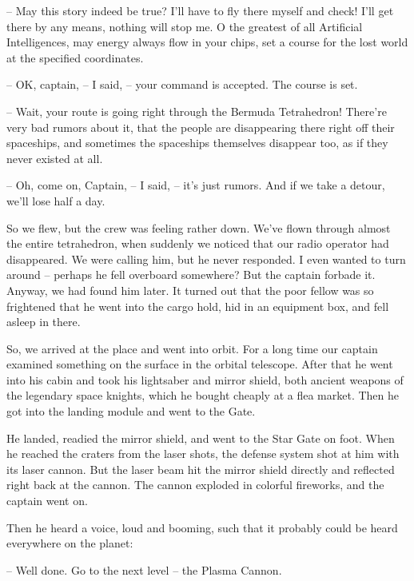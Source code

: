 \documentclass[ebook,oneside,final,openright]{memoir}
\begin{document}
– May this story indeed be true? I’ll have to fly there myself and check! I’ll get there by any means, nothing will stop me. O the greatest of all Artificial Intelligences, may energy always flow in your chips, set a course for the lost world at the specified coordinates.\par
– OK, captain, – I said, – your command is accepted. The course is set.\par
– Wait, your route is going right through the Bermuda Tetrahedron! There’re very bad rumors about it, that the people are disappearing there right off their spaceships, and sometimes the spaceships themselves disappear too, as if they never existed at all.\par
– Oh, come on, Captain, – I said, – it’s just rumors. And if we take a detour, we’ll lose half a day.\par
\par
So we flew, but the crew was feeling rather down. We’ve flown through almost the entire tetrahedron, when suddenly we noticed that our radio operator had disappeared. We were calling him, but he never responded. I even wanted to turn around – perhaps he fell overboard somewhere? But the captain forbade it. Anyway, we had found him later. It turned out that the poor fellow was so frightened that he went into the cargo hold, hid in an equipment box, and fell asleep in there.\par
\par
So, we arrived at the place and went into orbit. For a long time our captain examined something on the surface in the orbital telescope. After that he went into his cabin and took his lightsaber and mirror shield, both ancient weapons of the legendary space knights, which he bought cheaply at a flea market. Then he got into the landing module and went to the Gate.\par
\par
He landed, readied the mirror shield, and went to the Star Gate on foot. When he reached the craters from the laser shots, the defense system shot at him with its laser cannon. But the laser beam hit the mirror shield directly and reflected right back at the cannon. The cannon exploded in colorful fireworks, and the captain went on.\par
\par
Then he heard a voice, loud and booming, such that it probably could be heard everywhere on the planet:\par
– Well done. Go to the next level – the Plasma Cannon.\par
\end{document}
